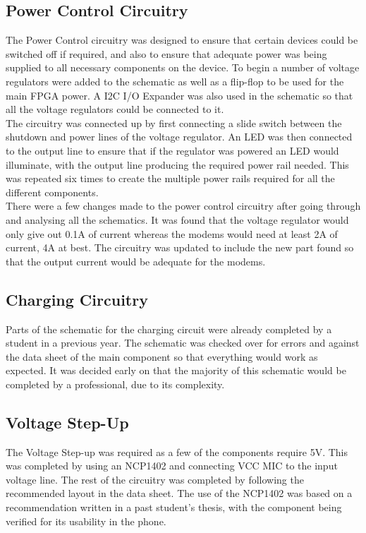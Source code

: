 \subsection{Power Control Circuitry}
\label{chap:batt}
	The Power Control circuitry was designed to ensure that certain devices could be switched off if required, and also to ensure that adequate power was being supplied to all necessary components on the device. To begin a number of voltage regulators were added to the schematic as well as a flip-flop to be used for the main FPGA power. A I2C I/O Expander was also used in the schematic so that all the voltage regulators could be connected to it.\\

	The circuitry was connected up by first connecting a slide switch between the shutdown and power lines of the voltage regulator. An LED was then connected to the output line to ensure that if the regulator was powered an LED would illuminate, with the output line producing the required power rail needed. This was repeated six times to create the multiple power rails required for all the different components.\\

	There were a few changes made to the power control circuitry after going through and analysing all the schematics. It was found that the voltage regulator would only give out 0.1A of current whereas the modems would need at least 2A of current, 4A at best. The circuitry was updated to include the new part found so that the output current would be adequate for the modems. 

\subsection{Charging Circuitry}

	Parts of the schematic for the charging circuit were already completed by a student in a previous year. The schematic was checked over for errors and against the data sheet of the main component so that everything would work as expected. It was decided early on that the majority of this schematic would be completed by a professional, due to its complexity.

\subsection{Voltage Step-Up}

	The Voltage Step-up was required as a few of the components require 5V. This was completed by using an NCP1402 and connecting VCC MIC to the input voltage line. The rest of the circuitry was completed by following the recommended layout in the data sheet. The use of the NCP1402 was based on a recommendation written in a past student's thesis, with the component being verified for its usability in the phone. 


